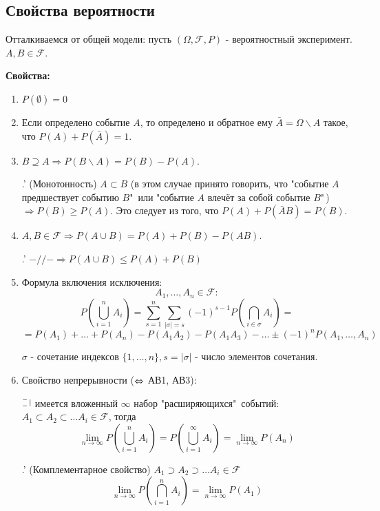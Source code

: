 \subsection{Свойства вероятности}

Отталкиваемся от общей модели: пусть $(\Omega, \mathcal{F}, P)$ - вероятностный эксперимент. $A, B \in \mathcal{F}$.

\textbf{Свойства:}

\begin{enumerate}
	\item $P(\emptyset) = 0$
	\item Если определено событие $A$, то определено и обратное ему $\bar A = \Omega \backslash A$ такое, что $P(A) + P( \bar A) = 1$.
	\item $B \supseteq A \Rightarrow P(B \backslash A) = P(B) - P(A)$. 
	
	.' (Монотонность) $A \subset B$ (в этом случае принято говорить, что "событие $A$ предшествует событию $B$"\, или "событие $A$ влечёт за собой событие $B$"\,) $\Rightarrow P(B) \ge P(A)$. Это следует из того, что $P(A) + P(\bar A B) = P(B)$.
	
	\item $A, B \in \mathcal{F} \Rightarrow P(A \cup B) = P(A) + P(B) - P(AB) $. 
	
	.' $-//- \Rightarrow P(A \cup B) \le P(A) + P(B)$
	
	\item Формула включения исключения: 
	\[A_1, \dots, A_n \in \mathcal{F}: \]
	\[P \left(\bigcup_{i=1}^{n} A_i \right) = \sum_{s=1}^{n} \sum_{|\sigma| = s} (-1)^{s-1} P \left(\bigcap_{i \in \sigma} A_i \right) = \] 
	\[= P(A_1) + \dots + P(A_n) - P(A_1 A_2) - P(A_1 A_3) - \dots \pm (-1)^n P(A_1, \dots, A_n) \]
	
	\noindent $\sigma$ - сочетание индексов $\{ 1, \dots, n \}, s = |\sigma|$ - число элементов сочетания.
	\item Свойство непрерывности ($\operatorname{\Leftrightarrow}$ АВ1, АВ3):
	
	$\letus$ имеется вложенный $\infty$ набор "расширяющихся"\, событий: $ A_1 \subset A_2 \subset \dots A_i \in \mathcal{F} $, тогда
	\[ \lim_{n \to \infty} P \left( \bigcup_{i=1}^{n} A_i \right) = P \left( \bigcup_{i=1}^{\infty} A_i \right) = \lim_{n \to \infty} P(A_n) \]
	
	.' (Комплементарное свойство) $A_1 \supset A_2 \supset \dots A_i \in \mathcal{F}$
	\[ \lim_{n \to \infty} P \left( \bigcap_{i=1}^{n} A_i \right) = \lim_{n \to \infty} P(A_1) \]
\end{enumerate}

